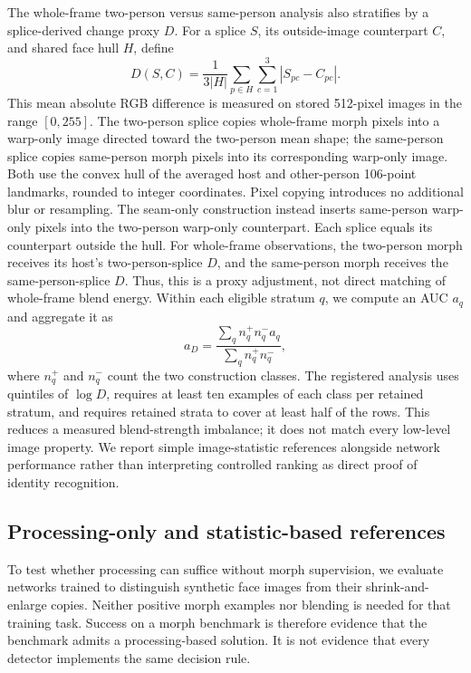 The whole-frame two-person versus same-person analysis also stratifies by a splice-derived change proxy $D$. For a splice $S$, its outside-image counterpart $C$, and shared face hull $H$, define
\begin{equation}
D(S,C)=\frac{1}{3|H|}\sum_{p\in H}\sum_{c=1}^{3}|S_{pc}-C_{pc}|.
\end{equation}
This mean absolute RGB difference is measured on stored 512-pixel images in the range $[0,255]$. The two-person splice copies whole-frame morph pixels into a warp-only image directed toward the two-person mean shape; the same-person splice copies same-person morph pixels into its corresponding warp-only image. Both use the convex hull of the averaged host and other-person 106-point landmarks, rounded to integer coordinates. Pixel copying introduces no additional blur or resampling. The seam-only construction instead inserts same-person warp-only pixels into the two-person warp-only counterpart. Each splice equals its counterpart outside the hull. For whole-frame observations, the two-person morph receives its host's two-person-splice $D$, and the same-person morph receives the same-person-splice $D$. Thus, this is a proxy adjustment, not direct matching of whole-frame blend energy. Within each eligible stratum $q$, we compute an AUC $a_q$ and aggregate it as
\begin{equation}
 a_D=\frac{\sum_q n_q^+n_q^- a_q}{\sum_q n_q^+n_q^-},
\end{equation}
where $n_q^+$ and $n_q^-$ count the two construction classes. The registered analysis uses quintiles of $\log D$, requires at least ten examples of each class per retained stratum, and requires retained strata to cover at least half of the rows. This reduces a measured blend-strength imbalance; it does not match every low-level image property. We report simple image-statistic references alongside network performance rather than interpreting controlled ranking as direct proof of identity recognition.

\subsection{Processing-only and statistic-based references}
To test whether processing can suffice without morph supervision, we evaluate networks trained to distinguish synthetic face images from their shrink-and-enlarge copies. Neither positive morph examples nor blending is needed for that training task. Success on a morph benchmark is therefore evidence that the benchmark admits a processing-based solution. It is not evidence that every detector implements the same decision rule.

